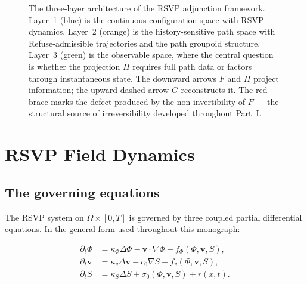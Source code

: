 \documentclass[12pt, oneside]{memoir}
\newcommand{\bv}{\mathbf{v}}
\begin{document}
\begin{figure}[htbp]
\caption{The three-layer architecture of the RSVP adjunction framework.  Layer~1 (blue)
is the continuous configuration space with RSVP dynamics.  Layer~2 (orange) is the
history-sensitive path space with Refuse-admissible trajectories and the path groupoid
structure.  Layer~3 (green) is the observable space, where the central question is
whether the projection $\Pi$ requires full path data or factors through instantaneous
state.  The downward arrows $F$ and $\Pi$ project information; the upward dashed arrow
$G$ reconstructs it.  The red brace marks the defect produced by the non-invertibility
of $F$ — the structural source of irreversibility developed throughout Part~I.}
\label{fig:architecture}
\end{figure}

\chapter{RSVP Field Dynamics}
\label{ch:rsvp}

\section{The governing equations}

The RSVP system on $\Omega \times [0,T]$ is governed by three coupled
partial differential equations.  In the general form used throughout this monograph:

\begin{align}
  \partial_t \Phi &= \kappa_\Phi \Delta \Phi - \bv \cdot \nabla \Phi + f_\Phi(\Phi,\bv,S),
  \label{eq:phi}\\[4pt]
  \partial_t \bv &= \kappa_v \Delta \bv - c_0 \nabla S + f_v(\Phi,\bv,S),
  \label{eq:v}\\[4pt]
  \partial_t S &= \kappa_S \Delta S + \sigma_0(\Phi,\bv,S) + r(x,t).
  \label{eq:S}
\end{align}
\end{document}
